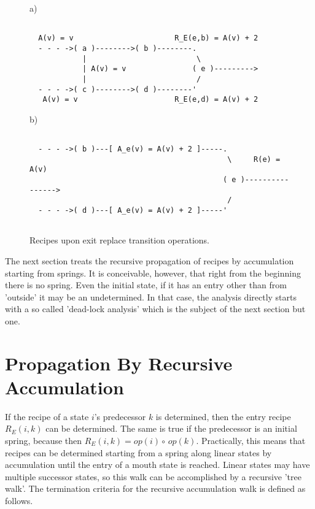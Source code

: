 \documentclass[12pt,a4paper]{scrartcl}
\begin{document}
\begin{figure}[htbp] \leavevmode \label{fig:interference-example}
a)
\begin{verbatim}

  A(v) = v                       R_E(e,b) = A(v) + 2
  - - - ->( a )-------->( b )--------.
            |                         \
            | A(v) = v               ( e )--------->
            |                         /
  - - - ->( c )-------->( d )--------'
   A(v) = v                      R_E(e,d) = A(v) + 2

\end{verbatim}
b)
\begin{verbatim}
                                 
  - - - ->( b )---[ A_e(v) = A(v) + 2 ]-----.
                                             \     R(e) = A(v)
                                            ( e )---------------->
                                             /
  - - - ->( d )---[ A_e(v) = A(v) + 2 ]-----'
                                 

\end{verbatim}
\caption{Recipes upon exit replace transition operations.}
\end{figure}

The next section treats the recursive propagation of recipes by accumulation
starting from springs.  It is conceivable, however, that right from the
beginning there is no spring.  Even the initial state, if it has an entry other
than from 'outside' it may be an undetermined.  In that case, the analysis directly
starts with a so called 'dead-lock analysis' which is the subject of the next
section but one.

%
\section{Propagation By Recursive Accumulation}

If the recipe of a state $i$'s predecessor $k$ is determined, then the entry
recipe $R_E(i,k)$ can be determined. The same is true if the predecessor is an initial
spring, because then $R_E(i,k) = op(i)\circ\,op(k)$. Practically, this means
that recipes can be determined starting from a spring along linear states by
accumulation until the entry of a mouth state is reached. Linear states may
have multiple successor states, so this walk can be accomplished by a recursive
'tree walk'.  The termination criteria for the recursive accumulation walk is
defined as follows.
\end{document}
